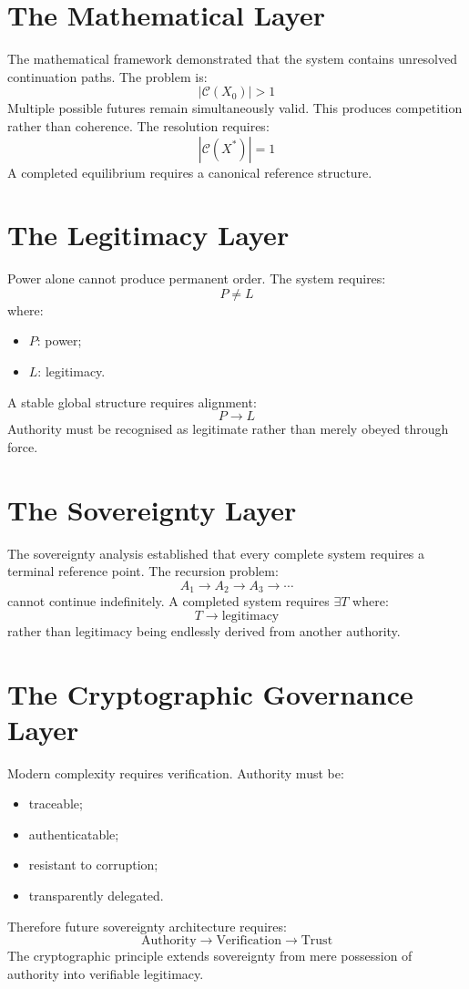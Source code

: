 \documentclass[11pt,openany]{book}
\theoremstyle{plain}
\theoremstyle{definition}
\begin{document}
\section{The Mathematical Layer}

The mathematical framework demonstrated that the system contains unresolved continuation paths. The problem is:
\[
|\mathcal{C}(X_0)| > 1
\]
Multiple possible futures remain simultaneously valid. This produces competition rather than coherence. The resolution requires:
\[
|\mathcal{C}(X^*)| = 1
\]
A completed equilibrium requires a canonical reference structure.

\section{The Legitimacy Layer}

Power alone cannot produce permanent order. The system requires:
\[
P \neq L
\]
where:
\begin{itemize}
\item \(P\): power;
\item \(L\): legitimacy.
\end{itemize}
A stable global structure requires alignment:
\[
P \longrightarrow L
\]
Authority must be recognised as legitimate rather than merely obeyed through force.

\section{The Sovereignty Layer}

The sovereignty analysis established that every complete system requires a terminal reference point. The recursion problem:
\[
A_1 \longrightarrow A_2 \longrightarrow A_3 \longrightarrow \cdots
\]
cannot continue indefinitely. A completed system requires \(\exists T\) where:
\[
T \longrightarrow \text{legitimacy}
\]
rather than legitimacy being endlessly derived from another authority.

\section{The Cryptographic Governance Layer}

Modern complexity requires verification. Authority must be:
\begin{itemize}
\item traceable;
\item authenticatable;
\item resistant to corruption;
\item transparently delegated.
\end{itemize}
Therefore future sovereignty architecture requires:
\[
\text{Authority} \longrightarrow \text{Verification} \longrightarrow \text{Trust}
\]
The cryptographic principle extends sovereignty from mere possession of authority into verifiable legitimacy.
\end{document}
